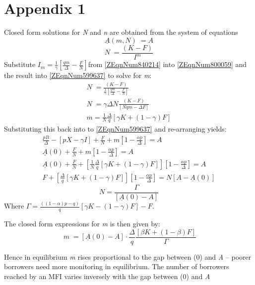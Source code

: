 \documentclass{article} %
\begin{document}
\noindent 
\section{\eject Appendix 1}

Closed form solutions for \textit{N }and \textit{n} are obtained from the system of equations
\begin{equation} \label{ZEqnNum599637} 
\underline{A}(m,N)\phantom{.} =A 
\end{equation} 
\begin{equation} \label{ZEqnNum800059} 
N\phantom{.} =\frac{(K-F)}{I^{m} }  
\end{equation} 
Substitute $I_{m} =\frac{1}{\gamma } \left[\frac{qm}{\Delta } -\frac{F}{N} \right]$from \eqref{ZEqnNum840214} into \eqref{ZEqnNum800059} and the result into \eqref{ZEqnNum599637} to solve for \textit{m}: 
\[\begin{array}{l} {N\phantom{.} =\frac{(K-F)}{\frac{1}{\gamma } \left[\frac{qm}{\Delta } -\frac{F}{N} \right]} } \\ {N\phantom{.} =\gamma \Delta N\frac{(K-F)}{\left[Nqm-\Delta F\right]} } \\ {m=\frac{1}{N} \frac{\Delta }{q} \left[\gamma K+(1-\gamma )F\right]} \end{array}\] 
Substituting this back into to \eqref{ZEqnNum599637} and re-arranging yields: 
\[\begin{array}{l} {\frac{pB}{\Delta } -\left[pX-\gamma I\right]+\frac{F}{N} +m\left[1-\frac{\alpha p}{\Delta } \right]=A} \\ {\underline{A}(0)+\frac{F}{N} +m\left[1-\frac{\alpha p}{\Delta } \right]=A} \\ {\underline{A}(0)+\frac{F}{N} +\left[\frac{1}{N} \frac{\Delta }{q} \left[\gamma K+(1-\gamma )F\right]\right]\left[1-\frac{\alpha p}{\Delta } \right]=A} \\ {F+\left[\frac{\Delta }{q} \left[\gamma K+(1-\gamma )F\right]\right]\left[1-\frac{\alpha p}{\Delta } \right]=N\left[A-\underline{A}(0)\right]} \end{array}\] 
\[\boxed{N=\frac{\Gamma }{\left[\underline{A}(0)-A\right]} } \] 
Where $\Gamma ={\tfrac{((1-\alpha )p-q)}{q}} [\gamma K-(1-\gamma )F]-F$.  

\noindent The closed form expressions for \textit{m }is then given by:
\[\boxed{\; m\phantom{.} =\left[\underline{A}(0)-A\right]\cdot \frac{\Delta }{q} \frac{\left[\beta K+(1-\beta )F\right]}{\Gamma } } \] 

Hence in equilibrium \textit{m }rises proportional to the gap between \textit{}(0) and \textit{A} -- poorer borrowers need more monitoring in equilibrium.  The number of borrowers reached by an MFI varies inversely with the gap between \textit{}(0) and \textit{A}
\end{document}
